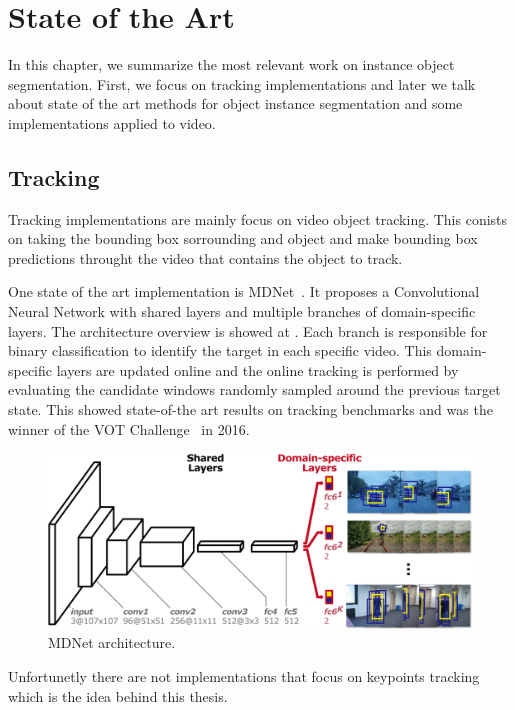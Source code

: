 
\chapter{State of the Art}
\label{cha:stateofart}

In this chapter, we summarize the most relevant work on instance object segmentation.
First, we focus on tracking implementations and later we talk about state of the art methods for object instance segmentation and some implementations applied to video.

\section{Tracking}
\label{sec:soa_tracking}

Tracking implementations are mainly focus on video object tracking.
This conists on taking the bounding box sorrounding and object and make bounding box predictions throught the video that contains the object to track.

One state of the art implementation is MDNet~\cite{nam2016learning}.
It proposes a Convolutional Neural Network with shared layers and multiple branches of domain-specific layers.
The architecture overview is showed at .
Each branch is responsible for binary classification to identify the target in each specific video.
This domain-specific layers are updated online and the online tracking is performed by evaluating the candidate windows randomly sampled around the previous target state.
This showed state-of-the art results on tracking benchmarks and was the winner of the VOT Challenge~\cite{VOT_TPAMI} in 2016.

\begin{figure}[h]
  \centering
  \includegraphics[width=.8\linewidth]{figures/mdnet/architecture.png}
  \caption{MDNet architecture. }
  \label{fig:mdnet}
\end{figure}

Unfortunetly there are not implementations that focus on keypoints tracking which is the idea behind this thesis.

